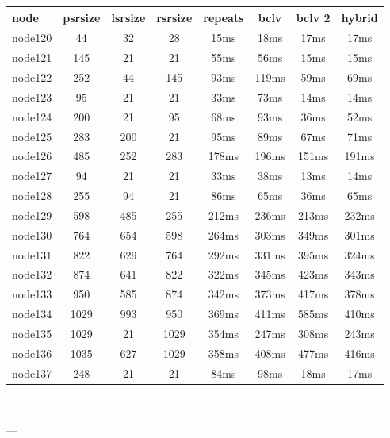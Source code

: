 \begin{tabular}{|l|c|c|c|c|c|c|c|}
\hline node & psrsize & lsrsize & rsrsize   & repeats & bclv & bclv 2 & hybrid\\
    \hline node120 & 44 & 32 & 28 & 15ms & 18ms & 17ms & 17ms\\
    \hline node121 & 145 & 21 & 21 & 55ms & 56ms & 15ms & 15ms\\
    \hline node122 & 252 & 44 & 145 & 93ms & 119ms & 59ms & 69ms\\
    \hline node123 & 95 & 21 & 21 & 33ms & 73ms & 14ms & 14ms\\
    \hline node124 & 200 & 21 & 95 & 68ms & 93ms & 36ms & 52ms\\
    \hline node125 & 283 & 200 & 21 & 95ms & 89ms & 67ms & 71ms\\
    \hline node126 & 485 & 252 & 283 & 178ms & 196ms & 151ms & 191ms\\
    \hline node127 & 94 & 21 & 21 & 33ms & 38ms & 13ms & 14ms\\
    \hline node128 & 255 & 94 & 21 & 86ms & 65ms & 36ms & 65ms\\
    \hline node129 & 598 & 485 & 255 & 212ms & 236ms & 213ms & 232ms\\
    \hline node130 & 764 & 654 & 598 & 264ms & 303ms & 349ms & 301ms\\
    \hline node131 & 822 & 629 & 764 & 292ms & 331ms & 395ms & 324ms\\
    \hline node132 & 874 & 641 & 822 & 322ms & 345ms & 423ms & 343ms\\
    \hline node133 & 950 & 585 & 874 & 342ms & 373ms & 417ms & 378ms\\
    \hline node134 & 1029 & 993 & 950 & 369ms & 411ms & 585ms & 410ms\\
    \hline node135 & 1029 & 21 & 1029 & 354ms & 247ms & 308ms & 243ms\\
    \hline node136 & 1035 & 627 & 1029 & 358ms & 408ms & 477ms & 416ms\\
    \hline node137 & 248 & 21 & 21 & 84ms & 98ms & 18ms & 17ms\\

\hline
\end{tabular} \

---

